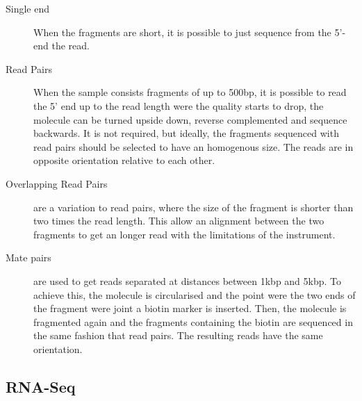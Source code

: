 \begin{description}
\item[Single end] When the fragments are short, it is possible to just sequence from the 5'-end the read.
\item[Read Pairs] When the sample consists fragments of up to 500bp, it is possible to read the 5' end up to the read length were the quality starts to drop, the molecule can be turned upside down, reverse complemented and sequence backwards. It is not required, but ideally, the fragments sequenced with read pairs should be selected to have an homogenous size. The reads are in opposite orientation relative to each other. 
\item[Overlapping Read Pairs] are a variation to read pairs, where the size of the fragment is shorter than two times the read length. This allow an alignment between the two fragments to get an longer read with the limitations of the instrument.
\item[Mate pairs]  are used to get reads separated at distances between 1kbp and 5kbp. To achieve this, the molecule is circularised and the point were the two ends of the fragment were joint a biotin marker is inserted. Then, the molecule is fragmented again and the fragments containing the biotin are sequenced in the same fashion that read pairs. The resulting reads have the same orientation.
\end{description}


\subsection{RNA-Seq}
\label{lit:rna-seq:lab}


